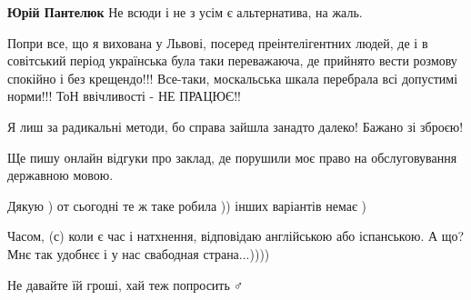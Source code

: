 \begin{itemize}
\begin{itemize}
\textbf{Юрій Пантелюк} Не всюди і не з усім є альтернатива, на жаль.
\end{itemize}

 

Попри все, що я вихована у Львові, посеред преінтелігентних людей, де і в
совітський період українська була таки переважаюча, де прийнято вести розмову
спокійно і без крещендо!!! Все-таки, москальська шкала перебрала всі допустимі
норми!!! ТоН ввічливості - НЕ ПРАЦЮЄ!! 

Я лиш за радикальні методи, бо справа зайшла занадто далеко! Бажано зі зброєю!


 

Ще пишу онлайн відгуки про заклад, де порушили моє право на обслуговування
державною мовою.


 
Дякую ) от сьогодні те ж таке робила )) інших варіантів немає ) 💛💙

 
Часом, (с) коли є час і натхнення, відповідаю англійською або іспанською. А що?
Мнє так удобнєє і у нас свабодная страна...))))

 
Не давайте їй гроші, хай теж попросить🤷♂️


\end{itemize}
